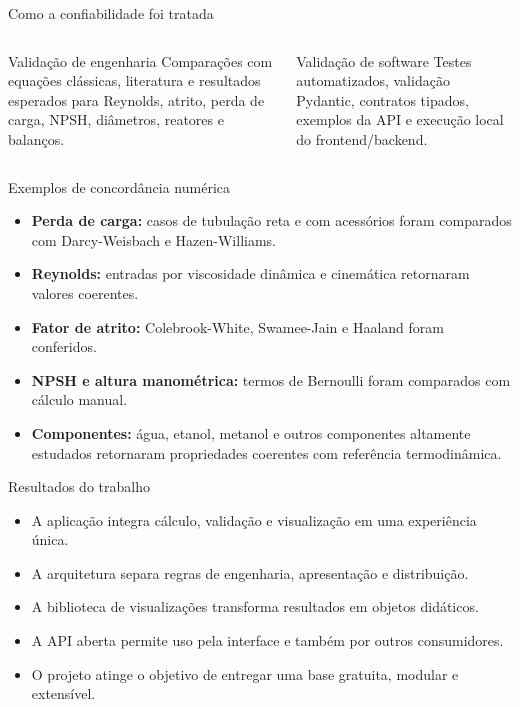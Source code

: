 
\begin{frame}{Como a confiabilidade foi tratada}
  \begin{columns}[T,onlytextwidth]
      \begin{block}{Validação de engenharia}
        Comparações com equações clássicas, literatura e resultados esperados para Reynolds, atrito, perda de carga, NPSH, diâmetros, reatores e balanços.
      \end{block}
      \begin{block}{Validação de software}
        Testes automatizados, validação Pydantic, contratos tipados, exemplos da API e execução local do frontend/backend.
      \end{block}
  \end{columns}
\end{frame}

\begin{frame}{Exemplos de concordância numérica}
  \begin{itemize}
    \item \textbf{Perda de carga:} casos de tubulação reta e com acessórios foram comparados com Darcy-Weisbach e Hazen-Williams.
    \item \textbf{Reynolds:} entradas por viscosidade dinâmica e cinemática retornaram valores coerentes.
    \item \textbf{Fator de atrito:} Colebrook-White, Swamee-Jain e Haaland foram conferidos.
    \item \textbf{NPSH e altura manométrica:} termos de Bernoulli foram comparados com cálculo manual.
    \item \textbf{Componentes:} água, etanol, metanol e outros componentes altamente estudados retornaram propriedades coerentes com referência termodinâmica.
  \end{itemize}
\end{frame}

\begin{frame}{Resultados do trabalho}
  \begin{itemize}
    \item A aplicação integra cálculo, validação e visualização em uma experiência única.
    \item A arquitetura separa regras de engenharia, apresentação e distribuição.
    \item A biblioteca de visualizações transforma resultados em objetos didáticos.
    \item A API aberta permite uso pela interface e também por outros consumidores.
    \item O projeto atinge o objetivo de entregar uma base gratuita, modular e extensível.
  \end{itemize}
\end{frame}

